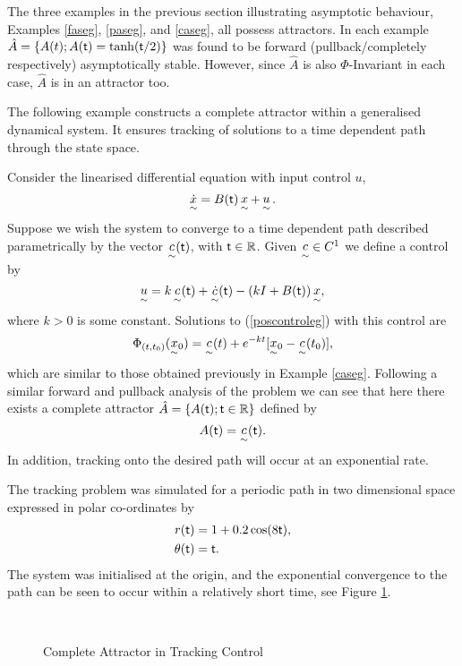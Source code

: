 The three examples in the previous section illustrating asymptotic
behaviour, Examples \ref{faseg}, \ref{paseg}, and \ref{caseg}, all possess
attractors. In each example $\hat{A} = \{A(t) ; A( \mathsf{\mathsf{t}}) = \tanh( \mathsf{\mathsf{t}}/2) \}$
was found to be forward (pullback/completely respectively)
asymptotically stable. However, since $\hat{A}$ is also $\Phi$-Invariant in
each case, $\hat{A}$ is in an attractor too.

The following example constructs a complete attractor within a generalised
dynamical system. It ensures tracking of solutions to a time
dependent path through the state space.

\begin{eg}
Consider the linearised differential equation with input
control $u$,
\begin{equation}\label{poscontroleg}
  \mathop{\dot{x}}\limits_{\sim} = B( \mathsf{\mathsf{t}}) \mathop{x}\limits_{\sim} + \mathop{u}\limits_{\sim}.
\end{equation}
Suppose we wish the system to converge to a time dependent path described
parametrically by the vector $\mathop{c}\limits_{\sim}( \mathsf{\mathsf{t}})$, with $ \mathsf{\mathsf{t}} \in \mathbb{R}$. Given
$\mathop{c}\limits_{\sim} \in C^1$ we define a control by
\[ \mathop{u}\limits_{\sim} = k \mathop{c}\limits_{\sim}( \mathsf{\mathsf{t}}) + \mathop{\dot{c}}\limits_{\sim}( \mathsf{\mathsf{t}}) -
                        (kI + B( \mathsf{\mathsf{t}})) \mathop{x}\limits_{\sim}, \]
where $k > 0$ is some constant. Solutions to (\ref{poscontroleg}) with this
control are
\[ \Phi_{(t,t_0)}(\mathop{x}\limits_{\sim}\!{}_{0}) = \mathop{c}\limits_{\sim}(t) + e^{-kt} [ \mathop{x}\limits_{\sim}\!{}_{0}
                - \mathop{c}\limits_{\sim}(t_0)], \]
which are similar to those obtained previously in Example
\ref{caseg}. Following a similar forward and pullback analysis of
the problem we can see that here there exists a complete attractor
$\hat{A} = \{A( \mathsf{\mathsf{t}}); \mathsf{\mathsf{t}}\in \mathbb{R} \}$ defined by
\[ A( \mathsf{\mathsf{t}}) = \mathop{c}\limits_{\sim}( \mathsf{\mathsf{t}}). \]
In addition, tracking onto the desired path will occur at an exponential
rate.

The tracking problem was simulated for a periodic path in two dimensional
space expressed in polar co-ordinates by
\begin{align*}
  r( \mathsf{\mathsf{t}}) &= 1 + 0.2 \cos (8 \mathsf{\mathsf{t}}), \\
  \theta( \mathsf{\mathsf{t}}) &=  \mathsf{\mathsf{t}}. \\
\end{align*}
The system was initialised at the origin, and the exponential
convergence to the path can be seen to occur within
a relatively short time, see Figure \ref{paegpic}.

\begin{figure}[htb]
\begin{center}
\leavevmode
\hbox{
\epsfxsize=9.5cm
  }%
\protect\caption{Complete Attractor in Tracking Control}
       \protect\label{paegpic}
\end{center}
\end{figure}
\end{eg}

